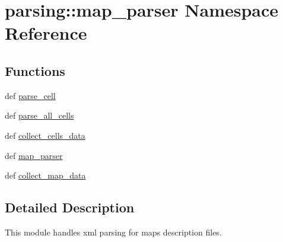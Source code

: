 \hypertarget{namespaceparsing_1_1map__parser}{\section{parsing\-:\-:map\-\_\-parser \-Namespace \-Reference}
\label{namespaceparsing_1_1map__parser}
}
\subsection*{\-Functions}
\begin{DoxyCompactItemize}
\item 
def \hyperlink{namespaceparsing_1_1map__parser_ac95058862719a1ab0d4f1edcab61c34a}{parse\-\_\-cell}
\item 
def \hyperlink{namespaceparsing_1_1map__parser_a88cb1d88728f93b0593e53fa33f7280b}{parse\-\_\-all\-\_\-cells}
\item 
def \hyperlink{namespaceparsing_1_1map__parser_a71ed6a54be8574564b90333f6810e84d}{collect\-\_\-cells\-\_\-data}
\item 
def \hyperlink{namespaceparsing_1_1map__parser_a51e06bfd8a212d3ff282d77f9d9e642c}{map\-\_\-parser}
\item 
def \hyperlink{namespaceparsing_1_1map__parser_ad07f69762561635b9f7b45ece6c51e69}{collect\-\_\-map\-\_\-data}
\end{DoxyCompactItemize}


\subsection{\-Detailed \-Description}
\begin{DoxyVerb}
This module handles xml parsing for maps description files.
\end{DoxyVerb}
 

